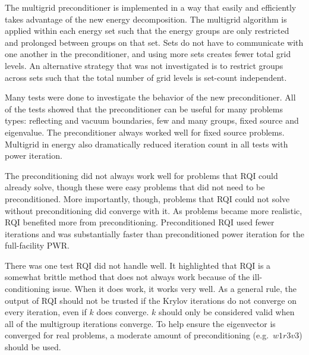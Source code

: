 
The multigrid preconditioner is implemented in a way that easily and efficiently takes advantage of the new energy decomposition. The multigrid algorithm is applied within each energy set such that the energy groups are only restricted and prolonged between groups on that set. Sets do not have to communicate with one another in the preconditioner, and using more sets creates fewer total grid levels. An alternative strategy that was not investigated is to restrict groups across sets such that the total number of grid levels is set-count independent. 

Many tests were done to investigate the behavior of the new preconditioner. All of the tests showed that the preconditioner can be useful for many problems types: reflecting and vacuum boundaries, few and many groups, fixed source and eigenvalue. The preconditioner always worked well for fixed source problems. Multigrid in energy also dramatically reduced iteration count in all tests with power iteration. 

The preconditioning did not always work well for problems that RQI could already solve, though these were easy problems that did not need to be preconditioned. More importantly, though, problems that RQI could not solve without preconditioning did converge with it. As problems became more realistic, RQI benefited more from preconditioning. Preconditioned RQI used fewer iterations and was substantially faster than preconditioned power iteration for the full-facility PWR.

There was one test RQI did not handle well. It highlighted that RQI is a somewhat brittle method that does not always work because of the ill-conditioning issue. When it does work, it works very well. As a general rule, the output of RQI should not be trusted if the Krylov iterations do not converge on every iteration, even if $k$ does converge. $k$ should only be considered valid when all of the multigroup iterations converge. To help ensure the eigenvector is converged for real problems, a moderate amount of preconditioning (e.g.\ $w1r3v3$) should be used. 

